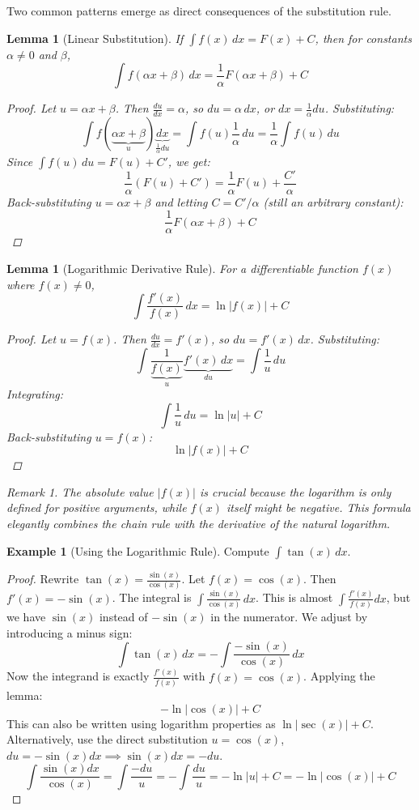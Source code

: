 \documentclass[11pt]{article}
\newtheorem{lemma}[theorem]{Lemma}
\theoremstyle{definition}
\newtheorem{example}[theorem]{Example}
\theoremstyle{remark}
\newtheorem{remark}[theorem]{Remark}
\begin{document}
Two common patterns emerge as direct consequences of the substitution rule.

\begin{lemma}[Linear Substitution]
If $\int f(x) \, dx = F(x) + C$, then for constants $\alpha \neq 0$ and $\beta$,
\[ \int f(\alpha x + \beta) \, dx = \frac{1}{\alpha} F(\alpha x + \beta) + C \]
\begin{proof}
Let $u = \alpha x + \beta$. Then $\frac{du}{dx} = \alpha$, so $du = \alpha \, dx$, or $dx = \frac{1}{\alpha} du$.
Substituting:
\[ \int f(\underbrace{\alpha x + \beta}_{u}) \underbrace{dx}_{\frac{1}{\alpha} du} = \int f(u) \frac{1}{\alpha} \, du = \frac{1}{\alpha} \int f(u) \, du \]
Since $\int f(u) \, du = F(u) + C'$, we get:
\[ \frac{1}{\alpha} (F(u) + C') = \frac{1}{\alpha} F(u) + \frac{C'}{\alpha} \]
Back-substituting $u = \alpha x + \beta$ and letting $C = C'/\alpha$ (still an arbitrary constant):
\[ \frac{1}{\alpha} F(\alpha x + \beta) + C \]
\end{proof}
\end{lemma}

\begin{lemma}[Logarithmic Derivative Rule]
For a differentiable function $f(x)$ where $f(x) \neq 0$,
\[ \int \frac{f'(x)}{f(x)} \, dx = \ln|f(x)| + C \]
\begin{proof}
Let $u = f(x)$. Then $\frac{du}{dx} = f'(x)$, so $du = f'(x) \, dx$.
Substituting:
\[ \int \frac{1}{\underbrace{f(x)}_{u}} \underbrace{f'(x) \, dx}_{du} = \int \frac{1}{u} \, du \]
Integrating:
\[ \int \frac{1}{u} \, du = \ln|u| + C \]
Back-substituting $u = f(x)$:
\[ \ln|f(x)| + C \]
\end{proof}
\begin{remark}
The absolute value $|f(x)|$ is crucial because the logarithm is only defined for positive arguments, while $f(x)$ itself might be negative. This formula elegantly combines the chain rule with the derivative of the natural logarithm.
\end{remark}
\end{lemma}

\begin{example}[Using the Logarithmic Rule]
Compute $\int \tan(x) \, dx$.
\begin{proof}
Rewrite $\tan(x) = \frac{\sin(x)}{\cos(x)}$.
Let $f(x) = \cos(x)$. Then $f'(x) = -\sin(x)$.
The integral is $\int \frac{\sin(x)}{\cos(x)} \, dx$. This is almost $\int \frac{f'(x)}{f(x)} dx$, but we have $\sin(x)$ instead of $-\sin(x)$ in the numerator. We adjust by introducing a minus sign:
\[ \int \tan(x) \, dx = -\int \frac{-\sin(x)}{\cos(x)} \, dx \]
Now the integrand is exactly $\frac{f'(x)}{f(x)}$ with $f(x)=\cos(x)$. Applying the lemma:
\[ -\ln|\cos(x)| + C \]
This can also be written using logarithm properties as $\ln|\sec(x)| + C$.
Alternatively, use the direct substitution $u = \cos(x)$, $du = -\sin(x) dx \implies \sin(x) dx = -du$.
\[ \int \frac{\sin(x) dx}{\cos(x)} = \int \frac{-du}{u} = -\int \frac{du}{u} = -\ln|u| + C = -\ln|\cos(x)| + C \]
\end{proof}
\end{example}
\end{document}
